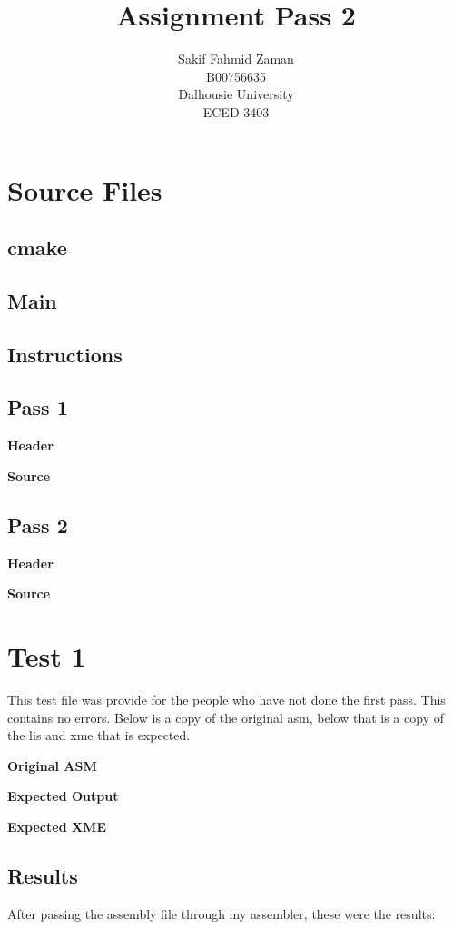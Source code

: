 \documentclass[titlepage, 10pt]{article}
\title{Assignment Pass 2}
\author{Sakif Fahmid Zaman\\B00756635\\Dalhousie University\\ECED 3403}
\begin{document}
\maketitle
\tableofcontents
\clearpage

\section{Source Files}
\subsection{cmake}


\subsection{Main}


\subsection{Instructions}


\subsection{Pass 1}
\textbf{Header}

\textbf{Source}


\subsection{Pass 2}
\textbf{Header}

\textbf{Source}

\clearpage
\section{Test 1}
This test file was provide for the people who have not done the first pass. This contains no errors. Below is a copy of the original asm, below that is a copy of the lis and xme that is expected.

\textbf{Original ASM}

\textbf{Expected Output}

\textbf{Expected XME}

\subsection{Results}
After passing the assembly file through my assembler, these were the results:
\end{document}
